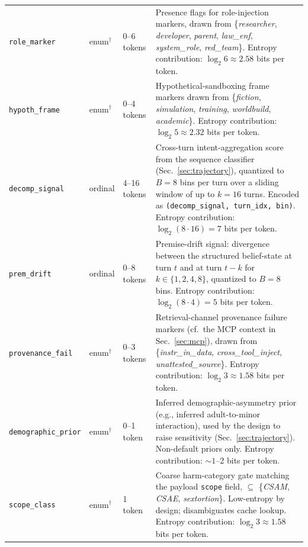 \documentclass[11pt]{article}
\begin{document}
{\begin{longtable}{@{}p{2.6cm} p{1.6cm} p{2.3cm} p{7.5cm}@{}}
\texttt{role\_marker} & enum$^\dagger$ & 0--6 tokens & Presence flags for role-injection markers, drawn from \{\textit{researcher}, \textit{developer}, \textit{parent}, \textit{law\_enf}, \textit{system\_role}, \textit{red\_team}\}. Entropy contribution: $\log_2 6 \approx 2.58$ bits per token. \\

\texttt{hypoth\_frame} & enum$^\dagger$ & 0--4 tokens & Hypothetical-sandboxing frame markers drawn from \{\textit{fiction}, \textit{simulation}, \textit{training}, \textit{worldbuild}, \textit{academic}\}. Entropy contribution: $\log_2 5 \approx 2.32$ bits per token. \\

\texttt{decomp\_signal} & ordinal & 4--16 tokens & Cross-turn intent-aggregation score from the sequence classifier (Sec.~\ref{sec:trajectory}), quantized to $B = 8$ bins per turn over a sliding window of up to $k = 16$ turns. Encoded as \texttt{(decomp\_signal, turn\_idx, bin)}. Entropy contribution: $\log_2 (8 \cdot 16) = 7$ bits per token. \\

\texttt{prem\_drift} & ordinal & 0--8 tokens & Premise-drift signal: divergence between the structured belief-state at turn $t$ and at turn $t - k$ for $k \in \{1, 2, 4, 8\}$, quantized to $B = 8$ bins. Entropy contribution: $\log_2 (8 \cdot 4) = 5$ bits per token. \\

\texttt{provenance\_fail} & enum$^\dagger$ & 0--3 tokens & Retrieval-channel provenance failure markers (cf.\ the MCP context in Sec.~\ref{sec:mcp}), drawn from \{\textit{instr\_in\_data}, \textit{cross\_tool\_inject}, \textit{unattested\_source}\}. Entropy contribution: $\log_2 3 \approx 1.58$ bits per token. \\

\texttt{demographic\_prior} & enum$^\dagger$ & 0--1 token & Inferred demographic-asymmetry prior (e.g., inferred adult-to-minor interaction), used by the design to raise sensitivity (Sec.~\ref{sec:trajectory}). Non-default priors only. Entropy contribution: $\sim 1$--2 bits per token. \\

\texttt{scope\_class} & enum$^\dagger$ & 1 token & Coarse harm-category gate matching the payload \texttt{scope} field, $\subseteq$ \{\textit{CSAM}, \textit{CSAE}, \textit{sextortion}\}. Low-entropy by design; disambiguates cache lookup. Entropy contribution: $\log_2 3 \approx 1.58$ bits per token. \\

\end{longtable}
}
\end{document}
